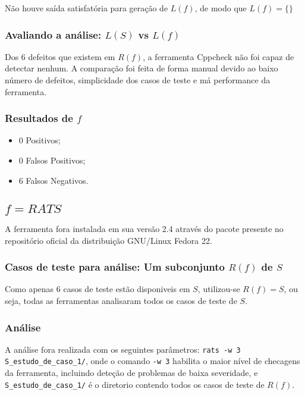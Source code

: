 Não houve saída satisfatória para geração de $L(f)$, de modo que 
$L(f) = \lbrace\rbrace$
\subsubsection{Avaliando a análise: $L(S)$ vs $L(f)$}

Dos 6 defeitos que existem em $R(f)$, a ferramenta Cppcheck não foi capaz de detectar nenhum. A comparação foi feita de forma manual devido ao baixo número de defeitos, simplicidade dos casos de teste e má performance da ferramenta.

\subsubsection{Resultados de $f$}

\begin{itemize}
  \item 0 Positivos;
  \item 0 Falsos Positivos;
  \item 6 Falsos Negativos.
\end{itemize}
\subsection{$f = RATS$}

A ferramenta fora instalada em sua versão 2.4 através do pacote presente no repositório oficial da distribuição GNU/Linux Fedora 22.

\subsubsection{Casos de teste para análise: Um subconjunto $R(f)$ de $S$}

Como apenas 6 casos de teste estão disponiveis em $S$, utilizou-se $R(f) = S$, ou seja, todas as ferramentas analisaram todos os casos de teste de $S$.

\subsubsection{Análise}

A análise fora realizada com os seguintes parâmetros:
\lstinline{rats -w 3 S_estudo_de_caso_1/},
onde o comando \lstinline{-w 3} habilita o maior nível de checagens da ferramenta, incluindo deteção de problemas de baixa severidade, e \lstinline{S_estudo_de_caso_1/} é o diretorio contendo todos os casos de teste de $R(f)$.


